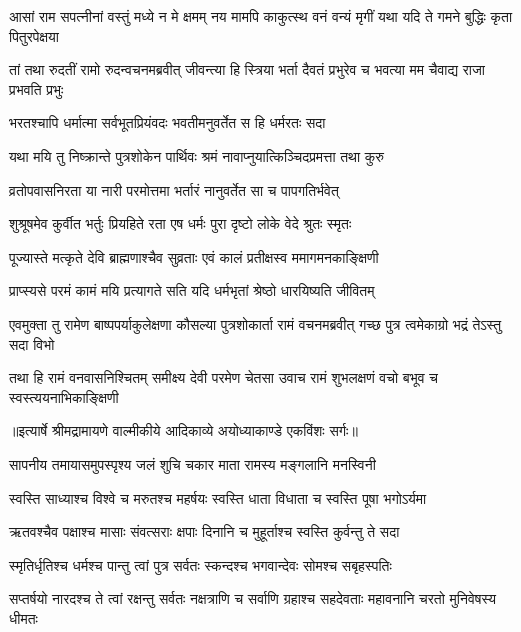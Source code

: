 \threelineshloka
{आसां राम सपत्नीनां वस्तुं मध्ये न मे क्षमम्}
{नय मामपि काकुत्स्थ वनं वन्यं मृगीं यथा}
{यदि ते गमने बुद्धिः कृता पितुरपेक्षया} %

\threelineshloka
{तां तथा रुदतीं रामो रुदन्वचनमब्रवीत्}
{जीवन्त्या हि स्त्रिया भर्ता दैवतं प्रभुरेव च}
{भवत्या मम चैवाद्य राजा प्रभवति प्रभुः} %

\twolineshloka
{भरतश्चापि धर्मात्मा सर्वभूतप्रियंवदः}
{भवतीमनुवर्तेत स हि धर्मरतः सदा} %

\twolineshloka
{यथा मयि तु निष्क्रान्ते पुत्रशोकेन पार्थिवः}
{श्रमं नावाप्नुयात्किञ्चिदप्रमत्ता तथा कुरु} %

\twolineshloka
{व्रतोपवासनिरता या नारी परमोत्तमा}
{भर्तारं नानुवर्तेत सा च पापगतिर्भवेत्} %

\twolineshloka
{शुश्रूषमेव कुर्वीत भर्तुः प्रियहिते रता}
{एष धर्मः पुरा दृष्टो लोके वेदे श्रुतः स्मृतः} %

\twolineshloka
{पूज्यास्ते मत्कृते देवि ब्राह्मणाश्चैव सुव्रताः}
{एवं कालं प्रतीक्षस्व ममागमनकाङ्क्षिणी} %

\twolineshloka
{प्राप्स्यसे परमं कामं मयि प्रत्यागते सति}
{यदि धर्मभृतां श्रेष्ठो धारयिष्यति जीवितम्} %

\threelineshloka
{एवमुक्ता तु रामेण बाष्पपर्याकुलेक्षणा}
{कौसल्या पुत्रशोकार्ता रामं वचनमब्रवीत्}
{गच्छ पुत्र त्वमेकाग्रो भद्रं तेऽस्तु सदा विभो} %

\fourlineindentedshloka
{तथा हि रामं वनवासनिश्चितम्}
{समीक्ष्य देवी परमेण चेतसा}
{उवाच रामं शुभलक्षणं वचो}
{बभूव च स्वस्त्ययनाभिकाङ्क्षिणी} %


{॥इत्यार्षे श्रीमद्रामायणे वाल्मीकीये आदिकाव्ये अयोध्याकाण्डे एकविंशः सर्गः॥}


\twolineshloka
{सापनीय तमायासमुपस्पृश्य जलं शुचि}
{चकार माता रामस्य मङ्गलानि मनस्विनी} %

\twolineshloka
{स्वस्ति साध्याश्च विश्वे च मरुतश्च महर्षयः}
{स्वस्ति धाता विधाता च स्वस्ति पूषा भगोऽर्यमा} %

\twolineshloka
{ऋतवश्चैव पक्षाश्च मासाः संवत्सराः क्षपाः}
{दिनानि च मुहूर्ताश्च स्वस्ति कुर्वन्तु ते सदा} %

\twolineshloka
{स्मृतिर्धृतिश्च धर्मश्च पान्तु त्वां पुत्र सर्वतः}
{स्कन्दश्च भगवान्देवः सोमश्च सबृहस्पतिः} %

\threelineshloka
{सप्तर्षयो नारदश्च ते त्वां रक्षन्तु सर्वतः}
{नक्षत्राणि च सर्वाणि ग्रहाश्च सहदेवताः}
{महावनानि चरतो मुनिवेषस्य धीमतः} %

